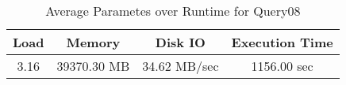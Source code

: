 \documentclass[../../main.tex]{subfiles}
\begin{document}
    \begin{table}
        \begin{center}
            \begin{tabular}{ |c|c|c|c| } 
            \hline
            Load & Memory & Disk IO & Execution Time\\
            \hline
            3.16 & 39370.30 MB & 34.62 MB/sec & 1156.00 sec \\
            \hline
            \end{tabular}
            \\[1pt]
            \caption{Average Parametes over Runtime for Query08}
        \end{center}
    \end{table}
    \pagebreak
\end{document}
